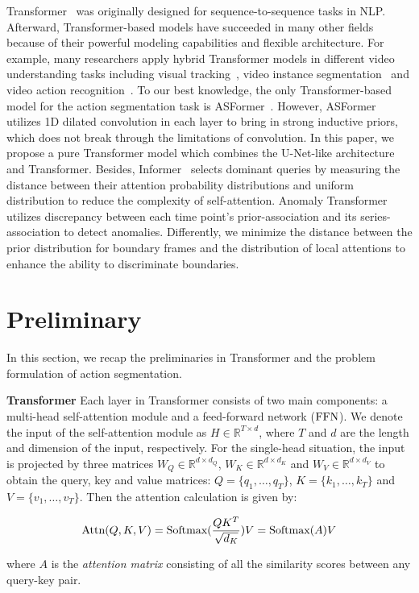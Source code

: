 \documentclass[letterpaper]{article} \usepackage[submission]{aaai23}  \usepackage{times}  \usepackage{helvet}  \usepackage{courier}  \usepackage[hyphens]{url}  \usepackage{graphicx} \urlstyle{rm} \def\UrlFont{\rm}  \usepackage{natbib}  \usepackage{caption} \frenchspacing  \setlength{\pdfpagewidth}{8.5in} \setlength{\pdfpageheight}{11in} \usepackage{algorithm}
\begin{document}
Transformer~\cite{Transformer} was originally designed for sequence-to-sequence tasks in NLP. Afterward, Transformer-based models have succeeded in many other fields because of their powerful modeling capabilities and flexible architecture. For example, many researchers apply hybrid Transformer models in different video understanding tasks including visual tracking~\cite{yan2021learning}, video instance segmentation~\cite{wang2021end} and video action recognition~\cite{girdhar2019video}. To our best knowledge, the only Transformer-based model for the action segmentation task is ASFormer~\cite{ASFormer}. However, ASFormer utilizes 1D dilated convolution in each layer to bring in strong inductive priors, which does not break through the limitations of convolution. In this paper, we propose a pure Transformer model which combines the U-Net-like architecture and Transformer. Besides, Informer~\cite{informer} selects dominant queries by measuring the distance between their attention probability distributions and uniform distribution to reduce the complexity of self-attention. Anomaly Transformer~\cite{xu2021anomaly} utilizes discrepancy between each time point’s prior-association and its series-association to detect anomalies. Differently, we minimize the distance between the prior distribution for boundary frames and the distribution of local attentions to enhance the ability to discriminate boundaries.

\section{Preliminary}
In this section, we recap the preliminaries in Transformer and the problem formulation of action segmentation.

{\bf Transformer} \quad
Each layer in Transformer consists of two main components: a multi-head self-attention module and a feed-forward network ($\textup{FFN}$). We denote the input of the self-attention module as $H\in \mathbb{R}^{T \times d}$, where $T$ and $d$ are the length and dimension of the input, respectively. For the single-head situation, the input is projected by three matrices $W_Q\in \mathbb{R}^{d\times d_Q}$, $W_K\in \mathbb{R}^{d\times d_K}$ and $W_V\in \mathbb{R}^{d \times d_V}$ to obtain the query, key and value matrices: $Q=\{q_1,\ldots,q_T\}$, $K=\{k_1,\ldots,k_T\}$ and $V=\{v_1,\ldots,v_T\}$. Then the attention calculation is given by:
\begin{small}
\begin{equation}
\label{eq:fullattention}
\textup{Attn}(Q,K,V) = \textup{Softmax}(\frac{QK^T}{\sqrt{d_K}})V=\textup{Softmax}(A)V 
\end{equation}
\end{small}
where $A$ is the \textit{attention matrix} consisting of all the similarity scores between any query-key pair.
\end{document}
